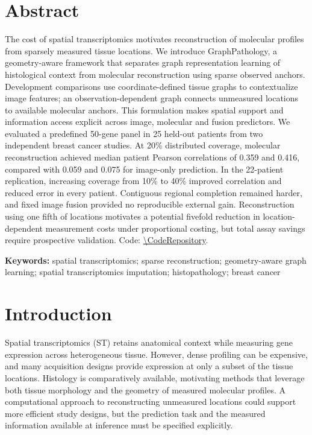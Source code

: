 
\begin{center}
{\Large\bfseries \PaperTitle\par}
\vspace{12pt}
\AuthorNames\par
\vspace{5pt}
\AuthorAffiliations\par
\vspace{5pt}
\Correspondence\par
\end{center}
\vspace{8pt}
\section*{Abstract}
The cost of spatial transcriptomics motivates reconstruction of molecular profiles from sparsely measured tissue locations. We introduce GraphPathology, a geometry-aware framework that separates graph representation learning of histological context from molecular reconstruction using sparse observed anchors. Development comparisons use coordinate-defined tissue graphs to contextualize image features; an observation-dependent graph connects unmeasured locations to available molecular anchors. This formulation makes spatial support and information access explicit across image, molecular and fusion predictors. We evaluated a predefined 50-gene panel in 25 held-out patients from two independent breast cancer studies. At 20\% distributed coverage, molecular reconstruction achieved median patient Pearson correlations of 0.359 and 0.416, compared with 0.059 and 0.075 for image-only prediction. In the 22-patient replication, increasing coverage from 10\% to 40\% improved correlation and reduced error in every patient. Contiguous regional completion remained harder, and fixed image fusion provided no reproducible external gain. Reconstruction using one fifth of locations motivates a potential fivefold reduction in location-dependent measurement costs under proportional costing, but total assay savings require prospective validation. Code: \url{\CodeRepository}.

\noindent\textbf{Keywords:} spatial transcriptomics; sparse reconstruction; geometry-aware graph learning; spatial transcriptomics imputation; histopathology; breast cancer

\linenumbers
\section{Introduction}
Spatial transcriptomics (ST) retains anatomical context while measuring gene expression across heterogeneous tissue\cite{stahl2016}. However, dense profiling can be expensive, and many acquisition designs provide expression at only a subset of the tissue locations. Histology is comparatively available, motivating methods that leverage both tissue morphology and the geometry of measured molecular profiles\cite{jaume2024,he2020}. A computational approach to reconstructing unmeasured locations could support more efficient study designs, but the prediction task and the measured information available at inference must be specified explicitly.

